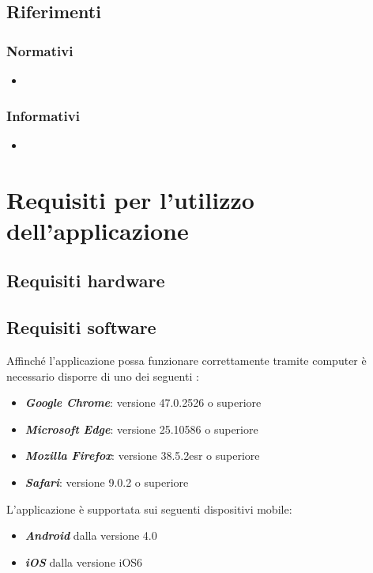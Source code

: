 \documentclass[12pt,a4paper]{article}
\begin{document}
	\subsection{Riferimenti}
	
	\subsubsection{Normativi}
	\begin{itemize}
		\item \TODO{}
		
	\end{itemize}
	
	\subsubsection{Informativi}
	\begin{itemize}
		\item \TODO{}
	\end{itemize}
	
	\newpage
	\section{Requisiti per l'utilizzo dell'applicazione} 
	\subsection{Requisiti hardware}
	\subsection{Requisiti software}
	
	Affinché l’applicazione possa funzionare correttamente tramite computer  è necessario disporre di uno dei seguenti :
	\begin{itemize}
		\item \textit{\textbf{Google Chrome}}: versione  47.0.2526 o superiore
		\item \textit{\textbf{Microsoft Edge}}: versione 25.10586 o superiore
	\item \textit{\textbf{Mozilla Firefox}}: versione 38.5.2esr o superiore
	\item\textit{\textbf{Safari}}: versione 9.0.2 o superiore
	\end{itemize}
 L'applicazione è supportata sui seguenti dispositivi mobile:
	\begin{itemize}
	\item \textit{\textbf{Android}} dalla versione 4.0
	\item \textit{\textbf{iOS}} dalla versione iOS6
\end{itemize}
\end{document}
